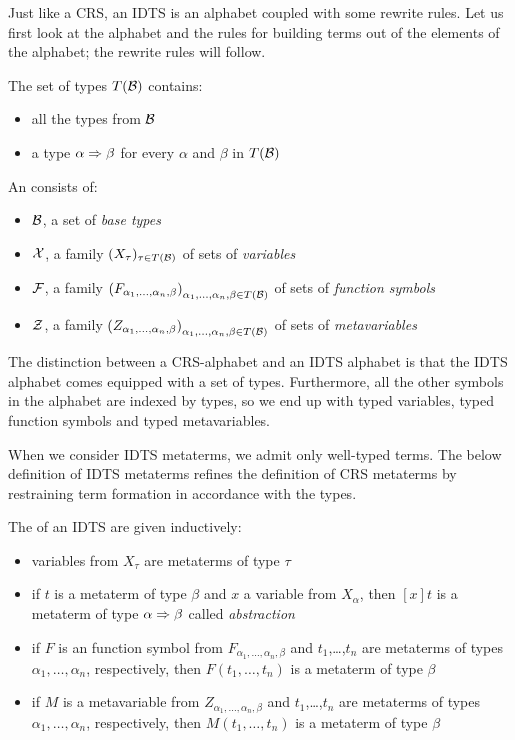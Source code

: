 Just like a CRS, an IDTS is an alphabet coupled with some rewrite
rules. Let us first look at the alphabet and the rules for building terms
out of the elements of the alphabet; the rewrite rules will follow.

\begin{definition}
  The set of types $T(\mathcal{B})$ contains:
  \begin{itemize}
  \item all the types from $\mathcal{B}$
  \item a type $\alpha \Rightarrow \beta$ for every $\alpha$ and $\beta$ in $T(\mathcal{B})$
  \end{itemize}
\end{definition}

\begin{definition}
  An  consists of:
  \begin{itemize}
  \item $\mathcal{B}$, a set of \emph{base types}
  \item $\mathcal{X}$, a family $(X_\tau)_{\tau \in T(\mathcal{B})}$ of sets of \emph{variables}
  \item $\mathcal{F}$, a family ${(F_{\alpha_1,\ldots,\alpha_n,\beta})}_{\alpha_1,\ldots,\alpha_n,\beta \in T(\mathcal{B})}$ of sets of \emph{function symbols}
  \item $\mathcal{Z}$, a family ${(Z_{\alpha_1,\ldots,\alpha_n,\beta})}_{\alpha_1,\ldots,\alpha_n,\beta \in T(\mathcal{B})}$ of sets of
    \emph{metavariables}
  \end{itemize}
\end{definition}

The distinction between a CRS-alphabet and an IDTS alphabet is that the
IDTS alphabet comes equipped with a set of types. Furthermore, all the
other symbols in the alphabet are indexed by types, so we end up with typed
variables, typed function symbols and typed metavariables.

When we consider IDTS metaterms, we admit only well-typed terms. The below
definition of IDTS metaterms refines the definition of CRS metaterms by
restraining term formation in accordance with the types.

\begin{definition}
  The  of an IDTS are given inductively:
  \begin{itemize}
  \item variables from $X_\tau$ are metaterms of type $\tau$
  \item if $t$ is a metaterm of type $\beta$ and $x$ a variable from
    $X_\alpha$, then $[x]t$ is a metaterm of type $\alpha \Rightarrow \beta$ called
    \emph{abstraction}
  \item if $F$ is an function symbol from
    $F_{\alpha_1,\ldots,\alpha_n,\beta}$ and $t_1$,\ldots,$t_n$ are
    metaterms of types $\alpha_1,\ldots,\alpha_n$, respectively, then
    $F(t_1,\ldots,t_n)$ is a metaterm of type $\beta$
  \item if $M$ is a metavariable from $Z_{\alpha_1,\ldots,\alpha_n,\beta}$
    and $t_1$,\ldots,$t_n$ are metaterms of types
    $\alpha_1,\ldots,\alpha_n$, respectively, then $M(t_1,\ldots,t_n)$ is a
    metaterm of type $\beta$
  \end{itemize}
\end{definition}

